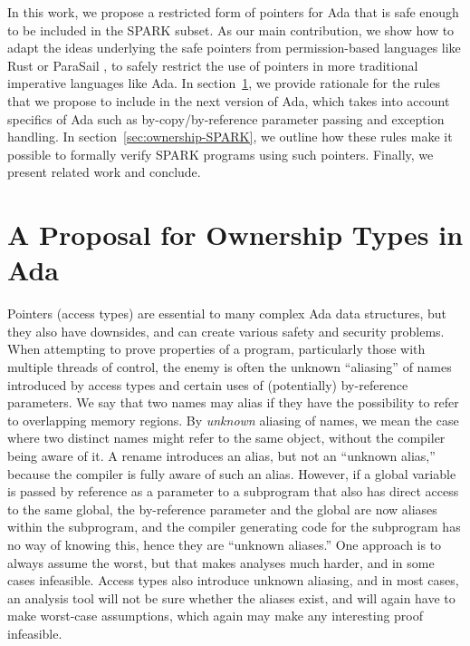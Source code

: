 \documentclass{llncs}
\begin{document}
In this work, we propose a restricted form of pointers for Ada that is safe enough to be included in the SPARK subset. As our main contribution, we show how to adapt the ideas underlying the safe pointers from permission-based languages like Rust \cite{Balasubramanian17} or ParaSail \cite{Taft11}, to safely restrict the use of pointers in more traditional imperative languages like Ada. In section~\ref{sec:ownership-Ada}, we provide rationale for the rules that we propose to include in the next version of Ada, which takes into account specifics of Ada such as by-copy/by-reference parameter passing and exception handling. In section~\ref{sec:ownership-SPARK}, we outline how these rules make it possible to formally verify SPARK programs using such pointers. Finally, we present related work and conclude.

\section{A Proposal for Ownership Types in Ada}
\label{sec:ownership-Ada}

Pointers (access types) are essential to many complex Ada data structures, but they also have downsides, and can create various safety and security problems.
When attempting to prove properties of a program, particularly those with multiple threads of control, the enemy is often the unknown ``aliasing'' of names introduced by
access types and certain uses of (potentially) by-reference parameters. We say that two names may alias if they have the possibility to refer to overlapping memory regions.
By \textit{unknown} aliasing of names, we mean the case where two distinct names might refer to the same object, without the compiler being aware of it.  A rename introduces
an alias, but not an ``unknown alias,'' because the compiler is fully aware of such an alias. However, if a global
variable is passed by reference as a parameter to a subprogram that also has direct access to the same global, the by-reference parameter and the global are now aliases within
the subprogram, and the compiler generating code for the subprogram has no way of knowing this, hence they are ``unknown aliases.''  One approach is to always assume the worst,
but that makes analyses much harder, and in some cases infeasible. Access types also introduce unknown aliasing, and in most cases, an analysis tool will not be
sure whether the aliases exist, and will again have to make worst-case assumptions, which again may make any interesting proof infeasible.
\end{document}
